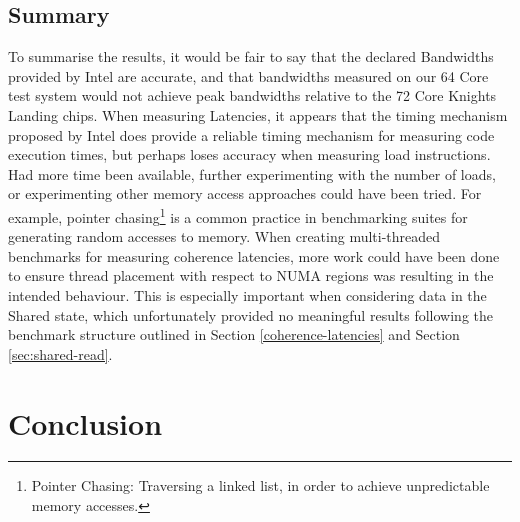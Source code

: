 \documentclass[bsc,frontabs,twoside,singlespacing,parskip,deptreport]{infthesis}     %
\begin{document}
\section{Summary}
To summarise the results, it would be fair to say that the declared Bandwidths provided by Intel are accurate, and that bandwidths measured on our 64 Core test system would not achieve peak bandwidths relative to the 72 Core Knights Landing chips. When measuring Latencies, it appears that the timing mechanism proposed by Intel\cite{code_exec_times} does provide a reliable timing mechanism for measuring code execution times, but perhaps loses accuracy when measuring load instructions. Had more time been available, further experimenting with the number of loads, or experimenting other memory access approaches could have been tried. For example, pointer chasing\footnote{Pointer Chasing: Traversing a linked list, in order to achieve unpredictable memory accesses.} is a common practice in benchmarking suites for generating random accesses to memory. When creating multi-threaded benchmarks for measuring coherence latencies, more work could have been done to ensure thread placement with respect to NUMA regions was resulting in the intended behaviour. This is especially important when considering data in the Shared state, which unfortunately provided no meaningful results following the benchmark structure outlined in Section \ref{coherence-latencies} and Section \ref{sec:shared-read}.

\chapter{Conclusion}\label{chap:conclusion}
\end{document}
